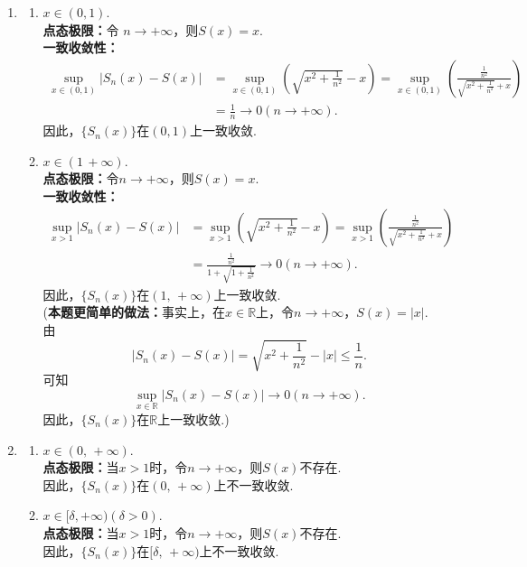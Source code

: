 \begin{enumerate}
\begin{solution}
\begin{enumerate}
        \item 
        \begin{enumerate}
        \item[i.] $x\in(0,1).$\\
        \textbf{点态极限：}令 $n\to+\infty$，则$S(x)=x$.\\
        \textbf{一致收敛性：}
        \[
        \begin{aligned}
        \sup_{x\in(0,1)}\left|S_n(x)-S(x)\right|&=\sup_{x\in(0,1)}\left(\sqrt{x^2+\frac{1}{n^2}}-x\right)=\sup_{x\in(0,1)}\left(\frac{\frac{1}{n^2}}{\sqrt{x^2+\frac{1}{n^2}}+x}\right)\\
        &=\frac{1}{n}\to 0 (n\to+\infty).
        \end{aligned}
        \]
        因此，$\{S_n(x)\}$在$(0,1)$上一致收敛.
        \item[ii.] $x\in(1\,+\infty).$\\
        \textbf{点态极限：}令$n\to+\infty$，则$S(x)=x$.\\
        \textbf{一致收敛性：}		
        \[
        \begin{aligned}
        \sup_{x>1}\left|S_n(x)-S(x)\right|&=\sup_{x>1}\left(\sqrt{x^2+\frac{1}{n^2}}-x\right)=\sup_{x>1}\left(\frac{\frac{1}{n^2}}{\sqrt{x^2+\frac{1}{n^2}}+x}\right)\\
        &=\frac{\frac{1}{n^2}}{1+\sqrt{1+\frac{1}{n^2}}}\to 0 (n\to+\infty).
        \end{aligned}
        \]
        因此，$\{S_n(x)\}$在$(1,\,+\infty)$上一致收敛.\\
        (\textbf{本题更简单的做法：}事实上，在$x\in\mathbb{R}$上，令$n\to+\infty$，$S(x)=\left|x\right|$.\\
        由
        \[
        \left|S_n(x)-S(x)\right|=\sqrt{x^2+\frac{1}{n^2}}-\left|x\right|\leq \frac{1}{n}.
        \]
        可知
        \[
        \sup_{x\in\mathbb{R}}\left|S_n(x)-S(x)\right|\to 0(n\to +\infty).
        \]
        因此，$\{S_n(x)\}$在$\mathbb{R}$上一致收敛.)
        \end{enumerate}

        \item 
        \begin{enumerate}
        \item[i.] $x\in(0,\,+\infty).$\\
        \textbf{点态极限：}当$x>1$时，令$n\to+\infty$，则$S(x)$不存在.\\
        因此，$\{S_n(x)\}$在$(0,\,+\infty)$上不一致收敛.
        \item[ii.] $x\in[\delta,+\infty)(\delta>0).$\\	\textbf{点态极限：}当$x>1$时，令$n\to+\infty$，则$S(x)$不存在.\\
        因此，$\{S_n(x)\}$在$[\delta,\,+\infty)$上不一致收敛.
        \end{enumerate}


\end{enumerate}
\end{solution}
\end{enumerate}
